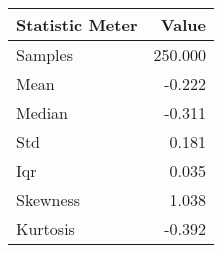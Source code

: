 \begin{tabular}{lr}
\hline
 Statistic Meter   &   Value \\
\hline
 Samples           & 250.000 \\
 Mean              &  -0.222 \\
 Median            &  -0.311 \\
 Std               &   0.181 \\
 Iqr               &   0.035 \\
 Skewness          &   1.038 \\
 Kurtosis          &  -0.392 \\
\hline
\end{tabular}